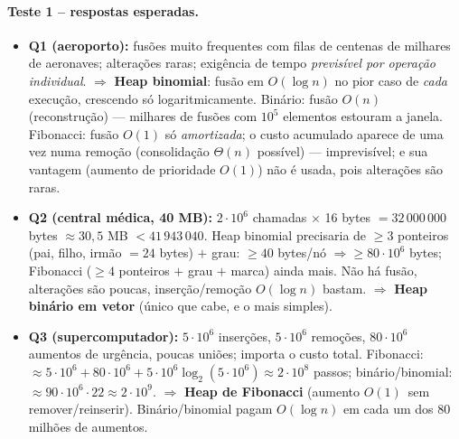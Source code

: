 \paragraph{Teste 1 -- respostas esperadas.}
\begin{itemize}
  \item \textbf{Q1 (aeroporto):} fusões muito frequentes com filas de centenas de milhares de aeronaves; alterações raras; exigência de tempo \emph{previsível por operação individual}. $\Rightarrow$ \textbf{Heap binomial}: fusão em $O(\log n)$ no pior caso de \emph{cada} execução, crescendo só logaritmicamente. Binário: fusão $O(n)$ (reconstrução) --- milhares de fusões com $10^5$ elementos estouram a janela. Fibonacci: fusão $O(1)$ só \emph{amortizada}; o custo acumulado aparece de uma vez numa remoção (consolidação $\Theta(n)$ possível) --- imprevisível; e sua vantagem (aumento de prioridade $O(1)$) não é usada, pois alterações são raras.
  \item \textbf{Q2 (central médica, 40 MB):} $2\cdot10^6$ chamadas $\times$ 16 bytes $=32\,000\,000$ bytes $\approx 30{,}5$ MB $<41\,943\,040$. Heap binomial precisaria de $\ge3$ ponteiros (pai, filho, irmão $=24$ bytes) $+$ grau: $\ge 40$ bytes/nó $\Rightarrow\ge 80\cdot10^6$ bytes; Fibonacci ($\ge4$ ponteiros $+$ grau $+$ marca) ainda mais. Não há fusão, alterações são poucas, inserção/remoção $O(\log n)$ bastam. $\Rightarrow$ \textbf{Heap binário em vetor} (único que cabe, e o mais simples).
  \item \textbf{Q3 (supercomputador):} $5\cdot10^6$ inserções, $5\cdot10^6$ remoções, $80\cdot10^6$ aumentos de urgência, poucas uniões; importa o custo total. Fibonacci: $\approx 5\cdot10^6+80\cdot10^6+5\cdot10^6\log_2(5\cdot10^6)\approx 2\cdot10^8$ passos; binário/binomial: $\approx 90\cdot10^6\cdot 22\approx 2\cdot10^9$. $\Rightarrow$ \textbf{Heap de Fibonacci} (aumento $O(1)$\am\ sem remover/reinserir). Binário/binomial pagam $O(\log n)$ em cada um dos 80 milhões de aumentos.
\end{itemize}
